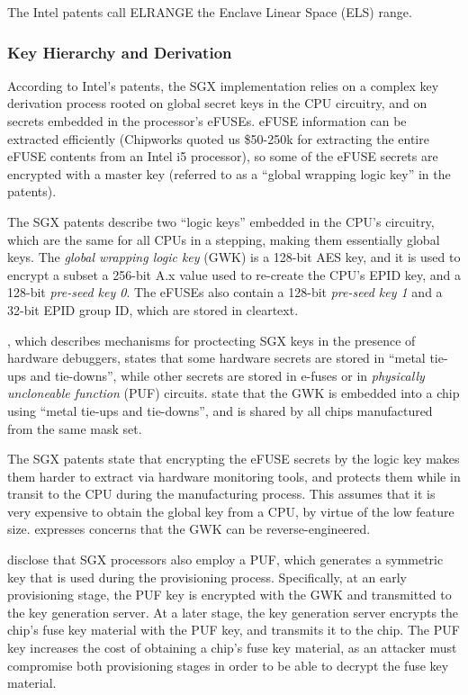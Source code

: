 The Intel patents call ELRANGE the Enclave Linear Space (ELS) range.



\subsubsection{Key Hierarchy and Derivation}

According to Intel's patents, the SGX implementation relies on a complex key
derivation process rooted on global secret keys in the CPU circuitry, and on
secrets embedded in the processor's eFUSEs. eFUSE information can be extracted
efficiently (Chipworks quoted us \$50-250k for extracting the entire eFUSE
contents from an Intel i5 processor), so some of the eFUSE secrets are
encrypted with a master key (referred to as a ``global wrapping logic key'' in
the patents).

The SGX patents describe two ``logic keys'' embedded in the CPU's circuitry,
which are the same for all CPUs in a stepping, making them essentially global
keys. The \textit{global wrapping logic key} (GWK) is a 128-bit AES key, and it is
used to encrypt a subset a 256-bit A.x value used to re-create the CPU's EPID
key, and a 128-bit \textit{pre-seed key 0}. The eFUSEs also contain a 128-bit
\textit{pre-seed key 1} and a 32-bit EPID group ID, which are stored in
cleartext.

\cite{shanbhogue2015gdxcsgx}, which describes mechanisms for proctecting SGX
keys in the presence of hardware debuggers, states that some hardware secrets
are stored in ``metal tie-ups and tie-downs'', while other secrets are stored
in e-fuses or in \textit{physically uncloneable function} (PUF) circuits.
\cite{brickell2014hardening, gotze2014provisioning} state that the GWK is
embedded into a chip using ``metal tie-ups and tie-downs'', and is shared by
all chips manufactured from the same mask set.

The SGX patents state that encrypting the eFUSE secrets by the logic key makes
them harder to extract via hardware monitoring tools, and protects them while
in transit to the CPU during the manufacturing process. This assumes that it is
very expensive to obtain the global key from a CPU, by virtue of the low
feature size. \cite{gotze2014provisioning} expresses concerns that the GWK can
be reverse-engineered.

\cite{gotze2014provisioning, gotze2014provisioning2} disclose that SGX
processors also employ a PUF, which generates a symmetric key that is used
during the provisioning process.  Specifically, at an early provisioning stage,
the PUF key is encrypted with the GWK and transmitted to the key generation
server. At a later stage, the key generation server encrypts the chip's fuse
key material with the PUF key, and transmits it to the chip. The PUF key
increases the cost of obtaining a chip's fuse key material, as an attacker must
compromise both provisioning stages in order to be able to decrypt the fuse key
material.

